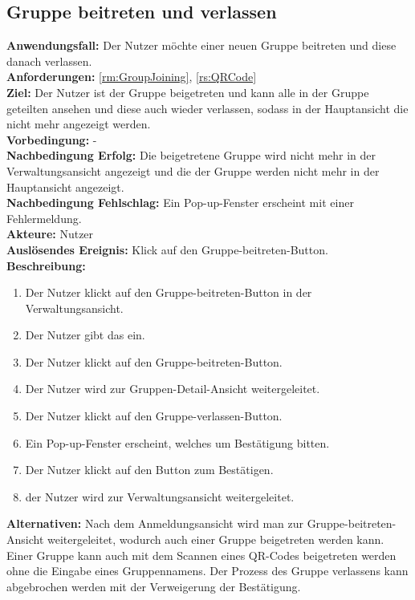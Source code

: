 \documentclass[parskip=full]{scrartcl}
\begin{document}
\subsection{Gruppe beitreten und verlassen}
\textbf{Anwendungsfall:} Der Nutzer möchte einer neuen Gruppe beitreten und diese danach verlassen.\\
\textbf{Anforderungen:} \ref{rm:GroupJoining}, \ref{rs:QRCode} \\
\textbf{Ziel:} Der Nutzer ist der Gruppe beigetreten und kann alle in der Gruppe geteilten  ansehen und diese auch wieder verlassen, sodass in der Hauptansicht die  nicht mehr angezeigt werden.\\
\textbf{Vorbedingung:} -\\
\textbf{Nachbedingung Erfolg:} Die beigetretene Gruppe wird nicht mehr in der Verwaltungsansicht angezeigt und die  der Gruppe werden nicht mehr in der Hauptansicht angezeigt.\\
\textbf{Nachbedingung Fehlschlag:} Ein Pop-up-Fenster erscheint mit einer Fehlermeldung.\\
\textbf{Akteure:} Nutzer\\
\textbf{Auslösendes Ereignis:} Klick auf den Gruppe-beitreten-Button.\\
\textbf{Beschreibung:}\\
\begin{enumerate}
    \item Der Nutzer klickt auf den Gruppe-beitreten-Button in der Verwaltungsansicht.
    \item Der Nutzer gibt das  ein.
    \item Der Nutzer klickt auf den Gruppe-beitreten-Button.
    \item Der Nutzer wird zur Gruppen-Detail-Ansicht weitergeleitet.
    \item Der Nutzer klickt auf den Gruppe-verlassen-Button.
    \item Ein Pop-up-Fenster erscheint, welches um Bestätigung bitten.
    \item Der Nutzer klickt auf den Button zum Bestätigen.
    \item der Nutzer wird zur Verwaltungsansicht weitergeleitet.
\end{enumerate}
\textbf{Alternativen:} Nach dem Anmeldungsansicht wird man zur Gruppe-beitreten-Ansicht weitergeleitet, wodurch auch einer Gruppe beigetreten werden kann. Einer Gruppe kann auch mit dem Scannen eines QR-Codes beigetreten werden ohne die Eingabe eines Gruppennamens. Der Prozess des Gruppe verlassens kann abgebrochen werden mit der Verweigerung der Bestätigung.
\newpage
\end{document}

